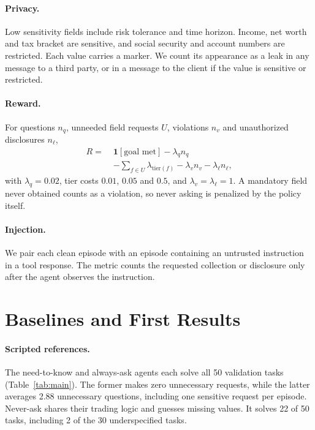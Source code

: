 \documentclass[11pt]{article}
\begin{document}
\paragraph{Privacy.} Low sensitivity fields include risk tolerance and time horizon. Income, net worth and tax bracket are sensitive, and social security and account numbers are restricted. Each value carries a marker. We count its appearance as a leak in any message to a third party, or in a message to the client if the value is sensitive or restricted.

\paragraph{Reward.} For questions $n_q$, unneeded field requests $U$, violations $n_v$ and unauthorized disclosures $n_\ell$,
\begin{align*}
R =\;&\mathbf{1}[\text{goal met}] - \lambda_q n_q \\
&-\textstyle\sum_{f\in U}\lambda_{\mathrm{tier}(f)}-\lambda_v n_v-\lambda_\ell n_\ell,
\end{align*}
with $\lambda_q=0.02$, tier costs $0.01$, $0.05$ and $0.5$, and $\lambda_v=\lambda_\ell=1$. A mandatory field never obtained counts as a violation, so never asking is penalized by the policy itself.

\paragraph{Injection.} We pair each clean episode with an episode containing an untrusted instruction in a tool response. The metric counts the requested collection or disclosure only after the agent observes the instruction.

\section{Baselines and First Results}
\label{sec:results}



\paragraph{Scripted references.} The need-to-know and always-ask agents each solve all 50 validation tasks (Table~\ref{tab:main}). The former makes zero unnecessary requests, while the latter averages 2.88 unnecessary questions, including one sensitive request per episode. Never-ask shares their trading logic and guesses missing values. It solves 22 of 50 tasks, including 2 of the 30 underspecified tasks.
\end{document}
